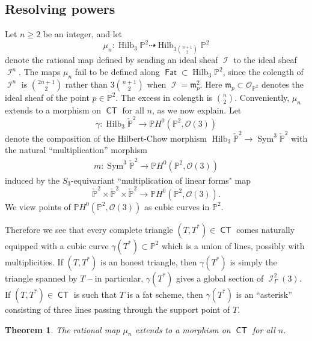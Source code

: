 \documentclass[reqno, 11pt]{amsart}
\theoremstyle{plain}
\newtheorem{theorem}{Theorem}[section]
\theoremstyle{remark}
\renewcommand{\P}{\mathbb{P}}
\DeclareMathOperator{\Hilb}{Hilb}
\DeclareMathOperator{\I}{\mathcal{I}}
\renewcommand{\O}{\mathcal{O}}
\DeclareMathOperator{\CT}{\mathsf{CT}}
\newcommand{\from}{\colon}
\DeclareMathOperator{\Fat}{\mathsf{Fat}}
\DeclareMathOperator{\Sym}{Sym}
\begin{document}
\subsection{Resolving powers} %
\label{sub:nthpowermaps}
Let $n \geq 2$ be an integer, and let
\[\mu_{n} \from \Hilb_{3}\P^{2} \dashrightarrow \Hilb_{3 {n+1 \choose
      2}}\P^{2}\] denote the rational map defined by sending an ideal
sheaf $\I$ to the ideal sheaf $\I^{n}$. The maps $\mu_{n}$ fail to be
defined along $\Fat \subset \Hilb_{3}\P^{2}$, since the colength of
$\I^{n}$ is ${2n+1 \choose 2}$ rather than $3 {n+1 \choose 2}$ when
$\I = \mathfrak{m}_{p}^{2}$. Here $\mathfrak{m}_{p} \subset \O_{\P^{2}}$
denotes the ideal sheaf of the point $p \in \P^{2}$. The excess in
colength is ${n \choose 2}$.  Conveniently, $\mu_{n}$ extends to a
morphism on $\CT$ for all $n$, as we now explain. Let
$$\gamma \from \Hilb_{3}\check{\P}^{2} \to \P H^{0}(\P^{2}, \O(3))$$ denote
the composition of the Hilbert-Chow morphism
$\Hilb_{3}\check{\P}^{2} \to \Sym^{3}\check{\P}^{2}$ with the natural
``multiplication'' morphism
\begin{eqnarray*}
  m \from \Sym^{3}\check{\P}^{2} \to \P H^{0}(\P^{2}, \O(3))
 \end{eqnarray*}
 induced by the $S_{3}$-equivariant ``multiplication of linear forms"
 map
 $$\check{\P}^{2} \times \check{\P}^{2} \times \check{\P}^{2} \to \P H^{0}(\P^{2}, \O(3)).$$
 We view points of $\P H^{0}(\P^{2}, \O(3))$ as cubic curves in
 $\P^{2}$.

 Therefore we see that every complete triangle $(T, T^{*}) \in \CT$ comes
 naturally equipped with a cubic curve $\gamma(T^{*}) \subset \P^{2}$
 which is a union of lines, possibly with multiplicities. If
 $(T, T^{*})$ is an honest triangle, then $\gamma(T^{*})$ is simply
 the triangle spanned by $T$ -- in particular, $\gamma(T^{*})$ gives a
 global section of $\I_{\Gamma}^{2}(3)$. If
 $(T, T^{*}) \in \CT$ is such that $T$ is a fat scheme,
 then $\gamma(T^{*})$ is an ``asterisk'' consisting of three lines
 passing through the support point of $T$.


\begin{theorem}
  \label{thm:resolventhpower}
  The rational map $\mu_{n}$ extends to a morphism on $\CT$ for all
  $n$.
\end{theorem}
\end{document}

